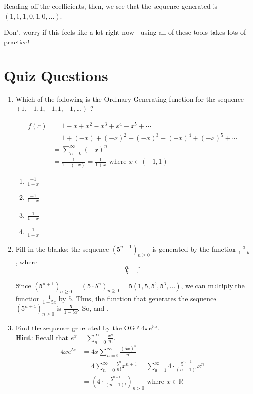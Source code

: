 \documentclass{article}
\theoremstyle{definition}
\begin{document}
Reading off the coefficients, then, we see that the sequence generated is $(1,0,1,0,1,0, \ldots)$.

Don't worry if this feels like a lot right now---using all of these tools takes lots of practice!











\newpage
\section*{Quiz Questions}

\begin{enumerate}
  \item Which of the following is the Ordinary 
  Generating function for the sequence $(1,-1,1,-1,1,-1, \ldots)$ ?

  \begin{align*}
  f(x) &= 1 - x + x^2 - x^3 + x^4 - x^5 + \cdots \\
  &= 1 + (- x) + (- x)^2 + (- x)^3 + (-x)^4 + (- x)^5 + \cdots \\
  &= \sum_{n=0}^{\infty} (-x)^n \\
  &= \frac{1}{1 - (-x)} = \frac{1}{1 + x} \text{ where $x \in (-1,1)$}
  \end{align*}
  \begin{enumerate}
    \item $\frac{-1}{1-x}$
    \item $\frac{-1}{1+x}$
    \item $\frac{1}{1-x}$
    \item $\frac{1}{1+x}$
  \end{enumerate}

  \item Fill in the blanks: the sequence $\left(5^{n+1}\right)_{n \geq 0}$ 
  is generated by the function $\frac{a}{1-b}$, where
  $$
  a=\square
  $$
  $$
  b=\square
  $$

  Since $\left(5^{n+1}\right)_{n \geq 0} = \left(5 \cdot 5^n\right)_{n \geq 0} = 5(1,5,5^2,5^3, \ldots)$,
  we can multiply the function $\frac{1}{1-5x}$ by $5$.
  Thus, the function that generates the sequence $\left(5^{n+1}\right)_{n \geq 0}$ is $\frac{5}{1-5x}$.
  So,  and .



  \item Find the sequence generated by the OGF $4 x e^{5 x}$.\\
  \textbf{Hint}: Recall that $e^{x}=\sum_{n=0}^{\infty} \frac{x^{n}}{n!}$.
  \begin{align*}
    4 x e^{5 x} &= 4 x \sum_{n=0}^{\infty} \frac{(5 x)^{n}}{n!} \\
    &= 4 \sum_{n=0}^{\infty} \frac{5^{n}}{n!} x^{n+1} = \sum_{n=1}^{\infty} 4 \cdot \frac{5^{n-1}}{(n-1)!} x^{n}\\
    &= \left(4 \cdot \frac{5^{n-1}}{(n-1)!}\right)_{n > 0} \text{ where $x \in \mathbb{R}$}
  \end{align*}


\end{enumerate}
\end{document}
